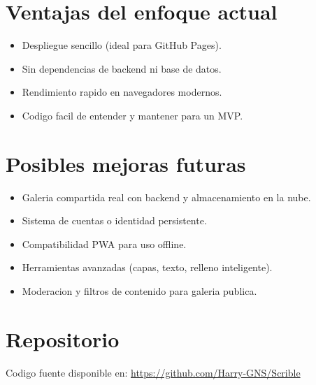 \documentclass[12pt,a4paper]{article}
\begin{document}
\section{Ventajas del enfoque actual}
\begin{itemize}[leftmargin=*]
  \item Despliegue sencillo (ideal para GitHub Pages).
  \item Sin dependencias de backend ni base de datos.
  \item Rendimiento rapido en navegadores modernos.
  \item Codigo facil de entender y mantener para un MVP.
\end{itemize}

\section{Posibles mejoras futuras}
\begin{itemize}[leftmargin=*]
  \item Galeria compartida real con backend y almacenamiento en la nube.
  \item Sistema de cuentas o identidad persistente.
  \item Compatibilidad PWA para uso offline.
  \item Herramientas avanzadas (capas, texto, relleno inteligente).
  \item Moderacion y filtros de contenido para galeria publica.
\end{itemize}

\section{Repositorio}
Codigo fuente disponible en:
\href{https://github.com/Harry-GNS/Scrible}{https://github.com/Harry-GNS/Scrible}
\end{document}
